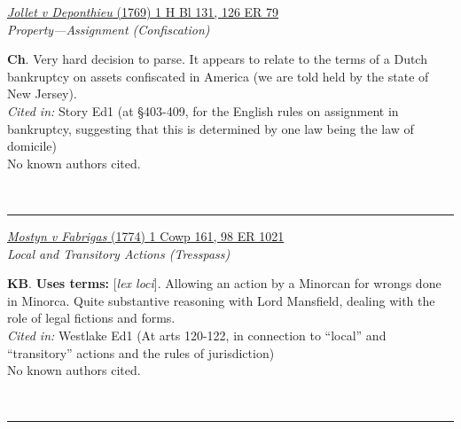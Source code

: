 \documentclass[twoside]{article}
\begin{document}
        \begin{small}
        \begin{center}
        \href{https://heinonline.org/HOL/P?h=hein.engrep/engrg0126&i=83}{\textit{Jollet v Deponthieu} (1769) 1 H Bl 131, 126 ER 79} \label{130} \\ 
\textit{Property---Assignment (Confiscation)}\\
        \end{center}
        \textbf{Ch}. Very hard decision to parse. It appears to relate to the terms of a Dutch bankruptcy on assets confiscated in America (we are told held by the state of New Jersey).\\\textit{Cited in: }Story Ed1 (at §403-409, for the English rules on assignment in bankruptcy, suggesting that this is determined by one law being the law of domicile)\\No known authors cited.
        \end{small}\\
        \rule{\textwidth}{0.5pt}
        

        \begin{small}
        \begin{center}
        \href{https://heinonline.org/HOL/P?h=hein.engrep/engrf0098&i=1025}{\textit{Mostyn v Fabrigas} (1774) 1 Cowp 161, 98 ER 1021} \label{12} \\ 
\textit{Local and Transitory Actions (Tresspass)}\\
        \end{center}
        \textbf{KB}.  \textbf{Uses terms: }[\textit{lex loci}]. Allowing an action by a Minorcan for wrongs done in Minorca. Quite substantive reasoning with Lord Mansfield, dealing with the role of legal fictions and forms.\\\textit{Cited in: }Westlake Ed1 (At arts 120-122, in connection to “local” and “transitory” actions and the rules of jurisdiction)\\No known authors cited.
        \end{small}\\
        \rule{\textwidth}{0.5pt}
        
\end{document}

